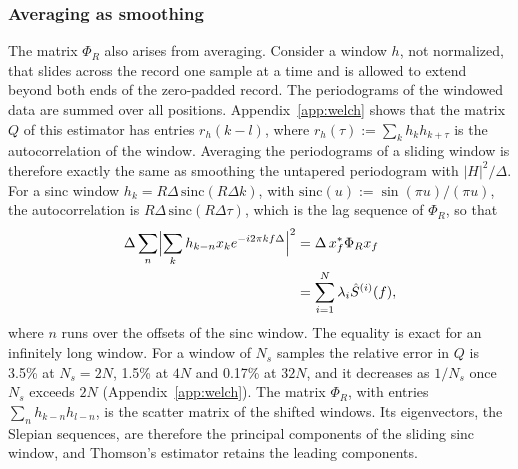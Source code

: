 \documentclass[10pt,twocolumn]{article}
\begin{document}
\subsubsection{Averaging as smoothing}
\label{sec:sliding}
The matrix $\Phi_R$ also arises from averaging. Consider a window $h$, not normalized, that slides across the record one sample at a time and is allowed to extend beyond both ends of the zero-padded record. The periodograms of the windowed data are summed over all positions. Appendix~\ref{app:welch} shows that the matrix $Q$ of this estimator has entries $r_h(k-l)$, where $r_h(\tau):=\sum_kh_kh_{k+\tau}$ is the autocorrelation of the window. Averaging the periodograms of a sliding window is therefore exactly the same as smoothing the untapered periodogram with $|H|^2/\Delta$. For a sinc window $h_k=R\Delta\,\mathrm{sinc}(R\Delta k)$, with $\mathrm{sinc}(u):=\sin(\pi u)/(\pi u)$, the autocorrelation is $R\Delta\,\mathrm{sinc}(R\Delta\tau)$, which is the lag sequence of $\Phi_R$, so that
\begin{align}
\Delta\sum_n\Bigl|\sum_kh_{k-n}x_ke^{-i2\pi kf\Delta}\Bigr|^2&=\Delta\,x_f^{*}\Phi_Rx_f\notag\\
&=\sum_{i=1}^N\lambda_i\hat S^{(i)}(f),
\label{eq:sliding}
\end{align}
where $n$ runs over the offsets of the sinc window. The equality is exact for an infinitely long window. For a window of $N_s$ samples the relative error in $Q$ is 3.5\% at $N_s=2N$, 1.5\% at $4N$ and 0.17\% at $32N$, and it decreases as $1/N_s$ once $N_s$ exceeds $2N$ (Appendix~\ref{app:welch}). The matrix $\Phi_R$, with entries $\sum_nh_{k-n}h_{l-n}$, is the scatter matrix of the shifted windows. Its eigenvectors, the Slepian sequences, are therefore the principal components of the sliding sinc window, and Thomson's estimator retains the leading components.
\end{document}
